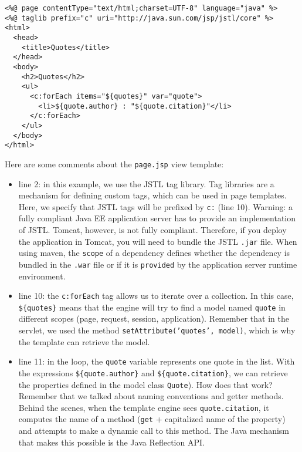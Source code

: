\vspace{10pt}
\begin{minipage}{\linewidth}
\begin{lstlisting}[frame=single]
<%@ page contentType="text/html;charset=UTF-8" language="java" %>
<%@ taglib prefix="c" uri="http://java.sun.com/jsp/jstl/core" %>
<html>
  <head>
    <title>Quotes</title>
  </head>
  <body>
    <h2>Quotes</h2>
    <ul>
      <c:forEach items="${quotes}" var="quote">
        <li>${quote.author} : "${quote.citation}"</li>
      </c:forEach>
    </ul>
  </body>
</html>
\end{lstlisting}
\end{minipage}

Here are some comments about the \texttt{page.jsp} view template:

\begin{itemize}
\item line 2: in this example, we use the \ac{JSTL} tag library. Tag libraries are a mechanism for defining custom tags, which can be used in page templates. Here, we specify that \ac{JSTL} tags will be prefixed by \texttt{c:} (line 10). Warning: a fully compliant Java EE application server has to provide an implementation of \ac{JSTL}. Tomcat, however, is not fully compliant. Therefore, if you deploy the application in Tomcat, you will need to bundle the \ac{JSTL} \texttt{.jar} file. When using maven, the \texttt{scope} of a dependency defines whether the dependency is bundled in the \texttt{.war} file or if it is \texttt{provided} by the application server runtime environment. 
\item line 10: the \texttt{c:forEach} tag allows us to iterate over a collection. In this case, \texttt{\$\{quotes\}} means that the engine will try to find a model named \texttt{quote} in different scopes (page, request, session, application). Remember that in the servlet, we used the method \texttt{setAttribute('quotes', model)}, which is why the template can retrieve the model.
\item line 11: in the loop, the \texttt{quote} variable represents one quote in the list. With the expressions \texttt{\$\{quote.author\}} and \texttt{\$\{quote.citation\}}, we can retrieve the properties defined in the model class \texttt{Quote}). How does that work? Remember that we talked about naming conventions and getter methods. Behind the scenes, when the template engine sees \texttt{quote.citation}, it computes the name of a method (\texttt{get} + capitalized name of the property) and attempts to make a dynamic call to this method. The Java mechanism that makes this possible is the Java Reflection API.
\end{itemize}

